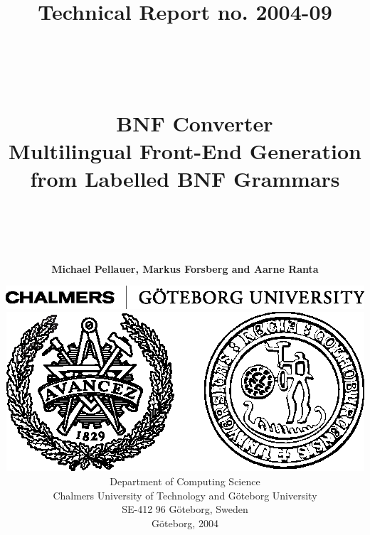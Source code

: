 \documentclass[titlepage,twoside,a4paper,11pt,english]{article}
\begin{document}

\begin{titlepage}
  \title{{\Large Technical Report no. 2004-09}
  \\ ~
  \\ ~
  \\ ~
  \\ ~
  {\LARGE \bf BNF Converter
    \\ \bf Multilingual Front-End Generation
    \\ \bf from Labelled BNF Grammars}
  \\ ~
  \\ ~
}

\author{\Large \bf Michael Pellauer, Markus Forsberg and Aarne Ranta}

\date{
  \enlargethispage{2.1\baselineskip}
  \includegraphics{ChalmGUtextsvEng.eps} \\
  \vspace{5mm}
  \includegraphics{ChalmGUmarke.eps} \\
  \vspace{12mm}
  Department of Computing Science \\
  Chalmers University of Technology
  and G\"{o}teborg University \\
  SE-412 96 G\"{o}teborg, Sweden \\
   \vspace{12mm}
   G{\"o}teborg, 2004
}
\end{titlepage}

\maketitle

\newpage{}
\thispagestyle{empty}
\mbox{}
\end{document}
